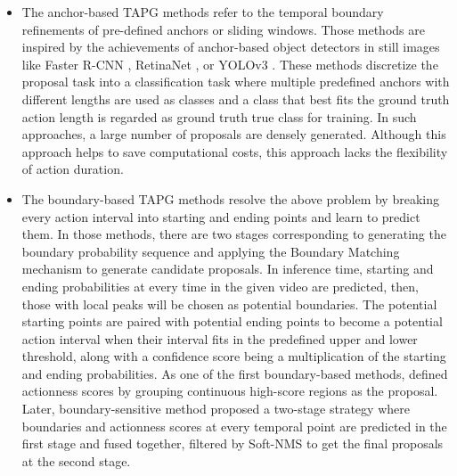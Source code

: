 \documentclass{ieeeaccess}
\begin{document}
\begin{itemize}
\item The anchor-based TAPG methods \cite{actionproposal_2016, FasterR_CNN_Action, anchor_1, anchor_2, anchor_3, SST_CVPR2017, anchor_5, CTAP} refer to the temporal boundary refinements of pre-defined anchors or sliding windows. Those methods are inspired by the achievements of anchor-based object detectors in still images like Faster R-CNN \cite{FasterRCNN}, RetinaNet \cite{RetinaNet}, or YOLOv3 \cite{yolov3}. These methods discretize the proposal task into a classification task where multiple predefined anchors with different lengths are used as classes and a class that best fits the ground truth action length is regarded as ground truth true class for training. In such approaches, a large number of proposals are densely generated. Although this approach helps to save computational costs, this approach lacks the flexibility of action duration.

\item The boundary-based TAPG methods \cite{boundary_0, lin2018bsn, liu2019multi} resolve the above problem by breaking every action interval into starting and ending points and learn to predict them. In those methods, there are two stages corresponding to generating the boundary probability sequence and applying the Boundary Matching mechanism to generate candidate proposals. In inference time, starting and ending probabilities at every time in the given video are predicted, then, those with local peaks will be chosen as potential boundaries. The potential starting points are paired with potential ending points to become a potential action interval when their interval fits in the predefined upper and lower threshold, along with a confidence score being a multiplication of the starting and ending probabilities. As one of the first boundary-based methods, \cite{boundary_0} defined actionness scores by grouping continuous high-score regions as the proposal. Later, boundary-sensitive method \cite{lin2018bsn} proposed a two-stage strategy where boundaries and actionness scores at every temporal point are predicted in the first stage and fused together, filtered by Soft-NMS to get the final proposals at the second stage. 


\end{itemize}
\end{document}
